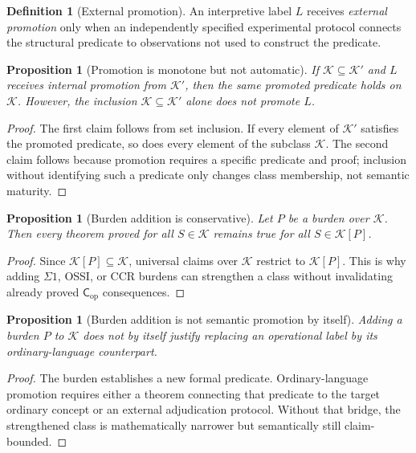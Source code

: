 \documentclass[11pt,a4paper]{article}
\newtheorem{proposition}[theorem]{Proposition}
\theoremstyle{definition}
\newtheorem{definition}[theorem]{Definition}
\newcommand{\Cop}{\mathsf{C}_{\mathrm{op}}}
\begin{document}
\begin{definition}[External promotion]
An interpretive label $L$ receives \emph{external promotion} only when an
independently specified experimental protocol connects the structural
predicate to observations not used to construct the predicate.
\end{definition}

\begin{proposition}[Promotion is monotone but not automatic]
If $\mathcal{K}\subseteq\mathcal{K}'$ and $L$ receives internal promotion from
$\mathcal{K}'$, then the same promoted predicate holds on $\mathcal{K}$.
However, the inclusion $\mathcal{K}\subseteq\mathcal{K}'$ alone does not
promote $L$.
\end{proposition}

\begin{proof}
The first claim follows from set inclusion. If every element of
$\mathcal{K}'$ satisfies the promoted predicate, so does every element of the
subclass $\mathcal{K}$. The second claim follows because promotion requires a
specific predicate and proof; inclusion without identifying such a predicate
only changes class membership, not semantic maturity.
\end{proof}

\begin{proposition}[Burden addition is conservative]
Let $P$ be a burden over $\mathcal{K}$. Then every theorem proved for all
$S\in\mathcal{K}$ remains true for all $S\in\mathcal{K}[P]$.
\end{proposition}

\begin{proof}
Since $\mathcal{K}[P]\subseteq\mathcal{K}$, universal claims over
$\mathcal{K}$ restrict to $\mathcal{K}[P]$. This is why adding $\Sigma1$,
OSSI, or CCR burdens can strengthen a class without invalidating already
proved $\Cop$ consequences.
\end{proof}

\begin{proposition}[Burden addition is not semantic promotion by itself]
Adding a burden $P$ to $\mathcal{K}$ does not by itself justify replacing an
operational label by its ordinary-language counterpart.
\end{proposition}

\begin{proof}
The burden establishes a new formal predicate. Ordinary-language promotion
requires either a theorem connecting that predicate to the target ordinary
concept or an external adjudication protocol. Without that bridge, the
strengthened class is mathematically narrower but semantically still
claim-bounded.
\end{proof}
\end{document}
